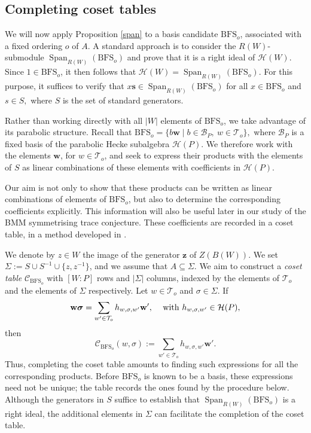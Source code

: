 \documentclass[11pt, reqno]{amsart}
\newcommand{\cH}{\mathcal{H}}
\newcommand{\BFS}{\mathrm{BFS}}
\numberwithin{equation}{section}
\theoremstyle{remark}
\begin{document}
		
		\subsection{Completing coset tables}\label{coset}
		

		
		
		We will now apply Proposition \ref{span} to a basis candidate $\BFS_o$, associated with a fixed ordering $o$ of $A$. A standard approach is to consider the $R(W)$-submodule
		$\operatorname{Span}_{R(W)}(\BFS_o)
		$
		and prove that it is a right ideal of $\cH(W)$. Since $1\in \BFS_o$, it then follows that $\cH(W)=\operatorname{Span}_{R(W)}(\BFS_o)$. For this purpose, it suffices to verify that
		$
		x{\mathbf{s}}\in \operatorname{Span}_{R(W)}(\BFS_o)$
		for all $x\in \BFS_o$ and $s\in S,$
		where $S$ is the set of standard generators.
		
		Rather than working directly with all $|W|$ elements of $\BFS_o$, we take advantage of its parabolic structure. Recall that
		$
		\BFS_o=\{b{\mathbf{w}}\mid b \in \mathcal{B}_P, \ w\in\mathcal{T}_o\},
		$
		where $\mathcal{B}_P$ is a fixed basis of the parabolic Hecke subalgebra $\cH(P)$. We therefore work with the elements ${\mathbf w}$, for $w\in\mathcal T_o$, and seek to express their products with the elements of $S$ as linear combinations of these elements with coefficients in $\cH(P)$.
		
		Our aim is not only to show that these products can be written as linear combinations of elements of $\BFS_o$, but also to determine the corresponding coefficients explicitly. This information will also be useful later in our study of the BMM symmetrising trace conjecture. These coefficients are recorded in a coset table, in a method developed in \cite{ChPf1,ChPf}.
		
		
		
		
		
		We denote by $z\in W$  the image of the generator $\mathbf z$ of $Z(B(W))$. We set $\Sigma:=S\cup S^{-1}\cup\{z,z^{-1}\}$, and we assume that $A \subseteq\Sigma$.
		We aim to construct a \emph{coset table} $\mathcal{C}_{\BFS_o}$ with $[W:P]$ rows and $|\Sigma|$ columns, indexed by the elements of $\mathcal T_o$ and the elements of $\Sigma$ respectively.  
		Let  $w\in\mathcal T_o$ and $\sigma\in\Sigma$. If 
		\[
		{\mathbf w}{\boldsymbol{\sigma}}
		=
		\sum_{w'\in\mathcal T_o}
		h_{w,\sigma,w'}{\mathbf{w'}},
		\,\quad
		{\rm with }\,\, h_{w,\sigma,w'}\in\cH(P),
		\]
		then $$\mathcal C_{\BFS_o}(w,\sigma):=\sum_{w'\in\mathcal T_o}
		h_{w,\sigma,w'}{\mathbf{w'}}.$$
		Thus, completing the coset table amounts to finding such expressions for all the corresponding products. Before $\mathrm{\BFS}_o$ is known to be a basis, these expressions need not be unique; the table records the ones found by the procedure below.
		Although the generators in $S$ suffice to establish that $\operatorname{Span}_{R(W)}(\BFS_o)$ is a right ideal, the additional elements in $\Sigma$ can facilitate the completion of the coset table.
		
\end{document}
